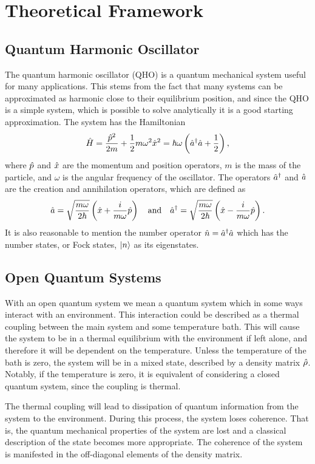 \section{Theoretical Framework}
\subsection{Quantum Harmonic Oscillator}
The quantum harmonic oscillator (QHO) is a quantum mechanical system useful for many applications. This stems from the fact that many systems can be approximated as harmonic close to their equilibrium position, and since the QHO is a simple system, which is possible to solve analytically it is a good starting approximation. The system has the Hamiltonian
\begin{equation}
    \hat{H} = \frac{\hat{p}^2}{2m} + \frac{1}{2}m\omega^2\hat{x}^2 = \hbar\omega\left(\hat{a}^{\dagger}\hat{a} + \frac{1}{2}\right),
\end{equation}
where $\hat{p}$ and $\hat{x}$ are the momentum and position operators, $m$ is the mass of the particle, and $\omega$ is the angular frequency of the oscillator. The operators $\hat{a}^{\dagger}$ and $\hat{a}$ are the creation and annihilation operators, which are defined as
\begin{equation}
    \hat{a} = \sqrt{\frac{m\omega}{2\hbar}} \left(\hat{x} + \frac{i}{m\omega} \hat{p}\right) \quad \text{and} \quad \hat{a}^{\dagger} = \sqrt{\frac{m\omega}{2\hbar}} \left(\hat{x} - \frac{i}{m\omega} \hat{p}\right).
\end{equation}
It is also reasonable to mention the number operator $\hat{n} = \hat{a}^{\dagger}\hat{a}$ which has the number states, or Fock states, $\ket{n}$ as its eigenstates.

\subsection{Open Quantum Systems}
With an open quantum system we mean a quantum system which in some ways interact with an environment. This interaction could be described as a thermal coupling between the main system and some temperature bath. This will cause the system to be in a thermal equilibrium with the environment if left alone, and therefore it will be dependent on the temperature. Unless the temperature of the bath is zero, the system will be in a mixed state, described by a density matrix $\hat{\rho}$. Notably, if the temperature is zero, it is equivalent of considering a closed quantum system, since the coupling is thermal. 

The thermal coupling will lead to dissipation of quantum information from the system to the environment. During this process, the system loses coherence. That is, the quantum mechanical properties of the system are lost and a classical description of the state becomes more appropriate. The coherence of the system is manifested in the off-diagonal elements of the density matrix. 

